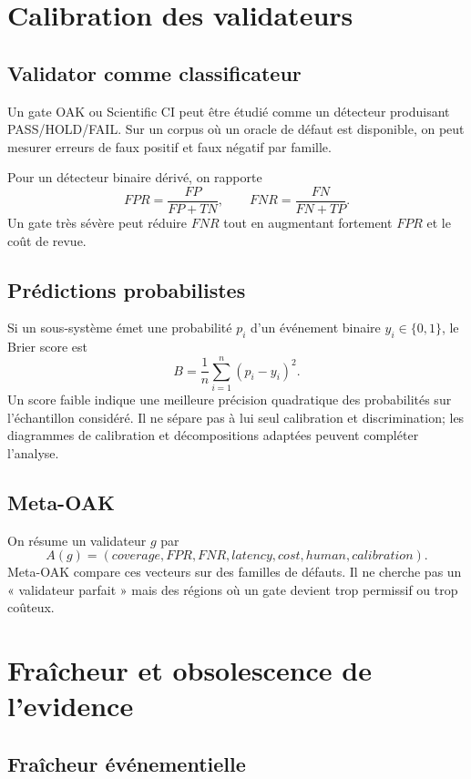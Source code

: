 \chapter{Calibration des validateurs}

\section{Validator comme classificateur}

Un gate OAK ou Scientific CI peut être étudié comme un détecteur produisant PASS/HOLD/FAIL. Sur un corpus où un oracle de défaut est disponible, on peut mesurer erreurs de faux positif et faux négatif par famille.

Pour un détecteur binaire dérivé, on rapporte
\[
FPR=\frac{FP}{FP+TN},\qquad FNR=\frac{FN}{FN+TP}.
\]
Un gate très sévère peut réduire $FNR$ tout en augmentant fortement $FPR$ et le coût de revue.

\section{Prédictions probabilistes}

Si un sous-système émet une probabilité $p_i$ d'un événement binaire $y_i\in\{0,1\}$, le Brier score est
\[
B=\frac1n\sum_{i=1}^n(p_i-y_i)^2.
\]
Un score faible indique une meilleure précision quadratique des probabilités sur l'échantillon considéré. Il ne sépare pas à lui seul calibration et discrimination; les diagrammes de calibration et décompositions adaptées peuvent compléter l'analyse.

\section{Meta-OAK}

On résume un validateur $g$ par
\[
A(g)=(coverage,FPR,FNR,latency,cost,human,calibration).
\]
Meta-OAK compare ces vecteurs sur des familles de défauts. Il ne cherche pas un « validateur parfait » mais des régions où un gate devient trop permissif ou trop coûteux.

\chapter{Fraîcheur et obsolescence de l'evidence}

\section{Fraîcheur événementielle}


